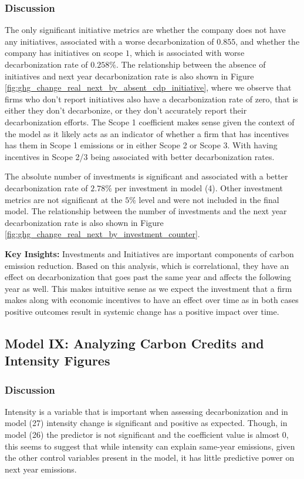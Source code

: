 \subsubsection{Discussion}
The only significant initiative metrics are whether the company does not have any initiatives, associated with a worse decarbonization of $0.855$, and whether the company has initiatives on scope $1$, which is associated with worse decarbonization rate of $0.258\%$. The relationship between the absence of initiatives and next year decarbonization rate is also shown in Figure \ref{fig:ghg_change_real_next_by_absent_cdp_initiative}, where we observe that firms who don't report initiatives also have a decarbonization rate of zero, that is either they don't decarbonize, or they don't accurately report their decarbonization efforts. The Scope 1 coefficient makes sense given the context of the model as it likely acts as an indicator of whether a firm that has incentives has them in Scope 1 emissions or in either Scope 2 or Scope 3. With having incentives in Scope 2/3 being associated with better decarbonization rates. 


The absolute number of investments is significant and associated with a better decarbonization rate of $2.78\%$ per investment in model (4). Other investment metrics are not significant at the $5\%$ level and were not included in the final model. The relationship between the number of investments and the next year decarbonization rate is also shown in Figure \ref{fig:ghg_change_real_next_by_investment_counter}.


\textbf{Key Insights:} Investments and Initiatives are important components of carbon emission reduction. Based on this analysis, which is correlational, they have an effect on decarbonization that goes past the same year and affects the following year as well. This makes intuitive sense as we expect the investment that a firm makes along with economic incentives to have an effect over time as in both cases positive outcomes result in systemic change has a positive impact over time.


\subsection{Model IX: Analyzing Carbon Credits and Intensity Figures}



\subsubsection{Discussion}
Intensity is a variable that is important when assessing decarbonization and in model (27) intensity change is significant and positive as expected. Though, in model (26) the predictor is not significant and the coefficient value is almost $0$, this seems to suggest that while intensity can explain same-year emissions, given the other control variables present in the model, it has little predictive power on next year emissions.

